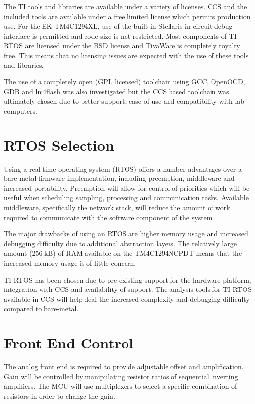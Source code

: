 \documentclass[12pt]{report}
\begin{document}
The TI tools and libraries are available under a variety of licenses. CCS and the included tools are available under a free limited license which permits production use. For the EK-TM4C1294XL, use of the built in Stellaris in-circuit debug interface is permitted and code size is not restricted. Most components of TI-RTOS are licensed under the BSD license and TivaWare is completely royalty free. This means that no licensing issues are expected with the use of these tools and libraries.

The use of a completely open (GPL licensed) toolchain using GCC, OpenOCD, GDB and lm4flash was also investigated but the CCS based toolchain was ultimately chosen due to better support, ease of use and compatibility with lab computers.

\section{RTOS Selection}
Using a real-time operating system (RTOS) offers a number advantages over a bare-metal firmware implementation, including preemption, middleware and increased portability\cite{RTOSorBM}. Preemption will allow for control of priorities which will be useful when scheduling sampling, processing and communication tasks. Available middleware, specifically the network stack, will reduce the amount of work required to communicate with the software component of the system.

The major drawbacks of using an RTOS are higher memory usage and increased debugging difficulty due to additional abstraction layers. The relatively large amount (256 kB) of RAM available on the TM4C1294NCPDT means that the increased memory usage is of little concern.

TI-RTOS has been chosen due to pre-existing support for the hardware platform, integration with CCS and availability of support. The analysis tools for TI-RTOS available in CCS will help deal the increased complexity and debugging difficulty compared to bare-metal.

\section{Front End Control}
The analog front end is required to provide adjustable offset and amplification. Gain will be controlled by manipulating resistor ratios of sequential inverting amplifiers. The MCU will use multiplexers to select a specific combination of resistors in order to change the gain.
\end{document}

